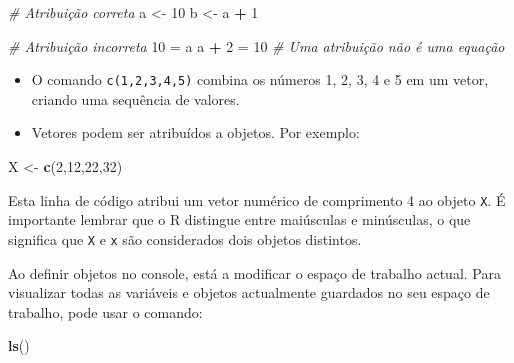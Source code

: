 \documentclass[
]{book}
\newenvironment{Shaded}{\begin{snugshade}}{\end{snugshade}}
\newcommand{\CommentTok}[1]{\textcolor[rgb]{0.56,0.35,0.01}{\textit{#1}}}
\newcommand{\DecValTok}[1]{\textcolor[rgb]{0.00,0.00,0.81}{#1}}
\newcommand{\FunctionTok}[1]{\textcolor[rgb]{0.13,0.29,0.53}{\textbf{#1}}}
\newcommand{\NormalTok}[1]{#1}
\newcommand{\OtherTok}[1]{\textcolor[rgb]{0.56,0.35,0.01}{#1}}
\newcommand{\SpecialCharTok}[1]{\textcolor[rgb]{0.81,0.36,0.00}{\textbf{#1}}}
\begin{document}
\begin{Shaded}
\begin{Highlighting}[]
\CommentTok{\# Atribuição correta }
\NormalTok{a }\OtherTok{\textless{}{-}} \DecValTok{10}
\NormalTok{b }\OtherTok{\textless{}{-}}\NormalTok{ a }\SpecialCharTok{+} \DecValTok{1}
\end{Highlighting}
\end{Shaded}

\begin{Shaded}
\begin{Highlighting}[]
\CommentTok{\# Atribuição incorreta}
\DecValTok{10} \OtherTok{=}\NormalTok{ a}
\NormalTok{a }\SpecialCharTok{+} \DecValTok{2} \OtherTok{=} \DecValTok{10} \CommentTok{\# Uma atribuição não é uma equação}
\end{Highlighting}
\end{Shaded}

\begin{itemize}
\item
  O comando \texttt{c(1,2,3,4,5)} combina os números 1, 2, 3, 4 e 5 em um
  vetor, criando uma sequência de valores.
\item
  Vetores podem ser atribuídos a objetos. Por exemplo:
\end{itemize}

\begin{Shaded}
\begin{Highlighting}[]
\NormalTok{X }\OtherTok{\textless{}{-}} \FunctionTok{c}\NormalTok{(}\DecValTok{2}\NormalTok{,}\DecValTok{12}\NormalTok{,}\DecValTok{22}\NormalTok{,}\DecValTok{32}\NormalTok{)}
\end{Highlighting}
\end{Shaded}

Esta linha de código atribui um vetor numérico de comprimento 4 ao
objeto \texttt{X}. É importante lembrar que o R distingue entre maiúsculas e
minúsculas, o que significa que \texttt{X} e \texttt{x} são considerados dois objetos
distintos.

Ao definir objetos no console, está a modificar o espaço de trabalho
actual. Para visualizar todas as variáveis e objetos actualmente
guardados no seu espaço de trabalho, pode usar o comando:

\begin{Shaded}
\begin{Highlighting}[]
\FunctionTok{ls}\NormalTok{()}
\end{Highlighting}
\end{Shaded}
\end{document}
